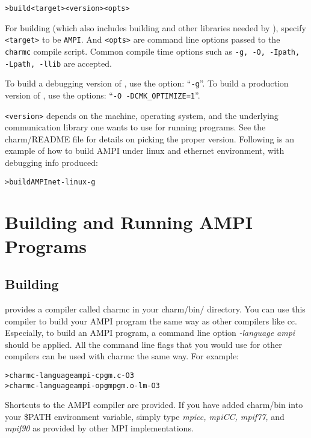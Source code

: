 \documentclass[10pt]{article}
\begin{document}
\begin{alltt}
> build <target> <version> <opts>
\end{alltt}

For building \ampi{} (which also includes building \charmpp{} and other
libraries needed by \ampi{}), specify \verb+<target>+ to be \verb+AMPI+. And
\verb+<opts>+ are command line options passed to the \verb+charmc+ compile
script.  Common compile time options such as \texttt{-g, -O, -Ipath, -Lpath,
-llib} are accepted. 

To build a debugging version of \ampi{}, use the option: ``\texttt{-g}''. 
To build a production version of \ampi{}, use the options: ``\texttt{-O 
-DCMK\_OPTIMIZE=1}''.

\verb+<version>+ depends on the machine, operating system, and the underlying
communication library one wants to use for running \ampi{} programs.
See the charm/README file for details on picking the proper version.
Following is an example of how to build AMPI under linux and ethernet
environment, with debugging info produced:

\begin{alltt}
> build AMPI net-linux -g
\end{alltt}

\section{Building and Running AMPI Programs}
\subsection{Building}
\charmpp{} provides a compiler called charmc in your charm/bin/ directory. 
You can use this compiler to build your AMPI program the same way as other
compilers like cc. Especially, to build an AMPI program, a command line 
option \emph{-language ampi} should be applied. All the command line 
flags that you would use for other compilers can be used with charmc the 
same way. For example:

\begin{alltt}
> charmc -language ampi -c pgm.c -O3
> charmc -language ampi -o pgm pgm.o -lm -O3 
\end{alltt}

Shortcuts to the AMPI compiler are provided. If you have added charm/bin 
into your \$PATH environment variable, simply type \emph{mpicc, mpiCC, 
mpif77,} and \emph{mpif90} as provided by other MPI implementations.
\end{document}
